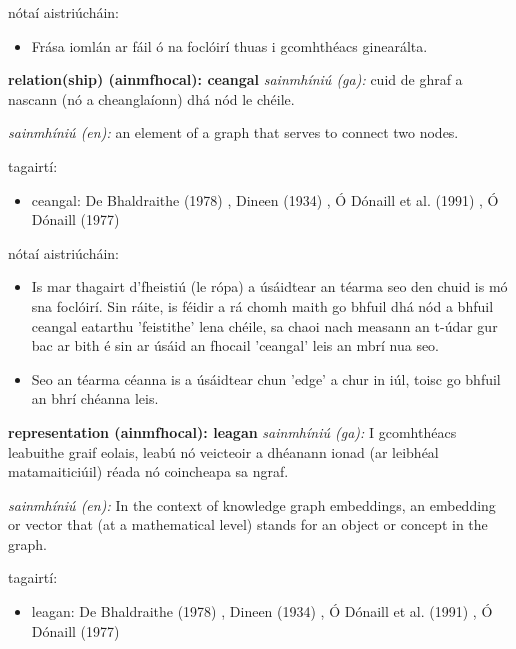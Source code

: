 \documentclass{article}
\begin{document}
nótaí aistriúcháin:
\begin{itemize}
	\item Frása iomlán ar fáil ó na foclóirí thuas i gcomhthéacs ginearálta.
\end{itemize}


\textbf{relation(ship) (ainmfhocal): ceangal}
\textit{sainmhíniú (ga):} cuid de ghraf a nascann (nó a cheanglaíonn) dhá nód le chéile.

\textit{sainmhíniú (en):} an element of a graph that serves to connect two nodes.

tagairtí:
\begin{itemize}
	\item ceangal: De Bhaldraithe (1978) \cite{de-bhaldraithe}, Dineen (1934) \cite{dineen}, Ó Dónaill et al. (1991) \cite{focloir-beag}, Ó Dónaill (1977) \cite{odonaill}
\end{itemize}

nótaí aistriúcháin:
\begin{itemize}
	\item Is mar thagairt d'fheistiú (le rópa) a úsáidtear an téarma seo den chuid is mó sna foclóirí. Sin ráite, is féidir a rá chomh maith go bhfuil dhá nód a bhfuil ceangal eatarthu 'feistithe' lena chéile, sa chaoi nach measann an t-údar gur bac ar bith é sin ar úsáid an fhocail 'ceangal' leis an mbrí nua seo.
	\item Seo an téarma céanna is a úsáidtear chun 'edge' a chur in iúl, toisc go bhfuil an bhrí chéanna leis.
\end{itemize}


\textbf{representation (ainmfhocal): leagan}
\textit{sainmhíniú (ga):} I gcomhthéacs leabuithe graif eolais, leabú nó veicteoir a dhéanann ionad (ar leibhéal matamaiticiúil) réada nó coincheapa sa ngraf.

\textit{sainmhíniú (en):} In the context of knowledge graph embeddings, an embedding or vector that (at a mathematical level) stands for an object or concept in the graph.

tagairtí:
\begin{itemize}
	\item leagan: De Bhaldraithe (1978) \cite{de-bhaldraithe}, Dineen (1934) \cite{dineen}, Ó Dónaill et al. (1991) \cite{focloir-beag}, Ó Dónaill (1977) \cite{odonaill}
\end{itemize}
\end{document}
